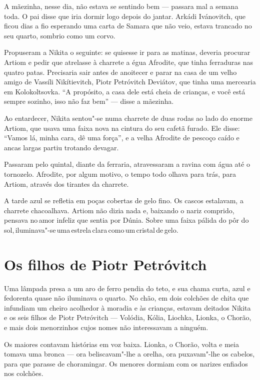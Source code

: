 A mãezinha, nesse dia, não estava se sentindo bem --- passara mal a
semana toda. O pai disse que iria dormir logo depois do jantar. Arkádi
Ivánovitch, que ficou dias a fio esperando uma carta de Samara que não
veio, estava trancado no seu quarto, sombrio como um corvo.

Propuseram a Nikita o seguinte: se quisesse ir para as matinas, deveria
procurar Artiom e pedir que atrelasse à charrete a égua Afrodite, que
tinha ferraduras nas quatro patas. Precisaria sair antes de anoitecer e
parar na casa de um velho amigo de Vassíli Nikítievitch, Piotr
Petróvitch Deviátov, que tinha uma mercearia em Kolokoltsovka. ``A
propósito, a casa dele está cheia de crianças, e você está sempre
sozinho, isso não faz bem'' --- disse a mãezinha.

Ao entardecer, Nikita sentou"-se numa charrete de duas rodas ao lado do
enorme Artiom, que usava uma faixa nova na cintura do seu cafetã furado.
Ele disse: ``Vamos lá, minha cara, dê uma força'', e a velha Afrodite de
pescoço caído e ancas largas partiu trotando devagar.

Passaram pelo quintal, diante da ferraria, atravessaram a ravina com água
até o tornozelo. Afrodite, por algum motivo, o tempo todo olhava para
trás, para Artiom, através dos tirantes da charrete.

A tarde azul se refletia em poças cobertas de gelo fino. Os cascos \enlargethispage{\baselineskip}
estalavam, a charrete chacoalhava. Artiom não dizia nada e, baixando o
nariz comprido, pensava no\,amor infeliz que sentia por Dúnia. Sobre uma
faixa pálida do pôr do sol,\,iluminava"-se\,uma\,estrela\,clara\,como\,um\,cristal\,de\,gelo.

\chapter{Os filhos de Piotr Petróvitch}

Uma lâmpada presa a um aro de ferro pendia do teto, e sua chama curta,
azul e fedorenta quase não iluminava o quarto. No chão, em dois colchões
de chita que infundiam um cheiro acolhedor à moradia e às crianças,
estavam deitados Nikita e os seis filhos de Piotr Petróvitch ---
Volódia, Kólia, Liochka, Lionka, o Chorão, e mais dois menorzinhos cujos
nomes não interessavam a ninguém.

Os maiores contavam histórias em voz baixa. Lionka, o Chorão, volta e
meia tomava uma bronca --- ora beliscavam"-lhe a orelha, ora puxavam"-lhe
os cabelos, para que parasse de choramingar. Os menores dormiam com os
narizes enfiados nos colchões.


